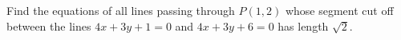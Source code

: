Find the equations of all lines passing through \(P(1,2)\) whose segment cut off between the lines \(4x+3y+1=0\) and \(4x+3y+6=0\) has length \(\sqrt2\).
